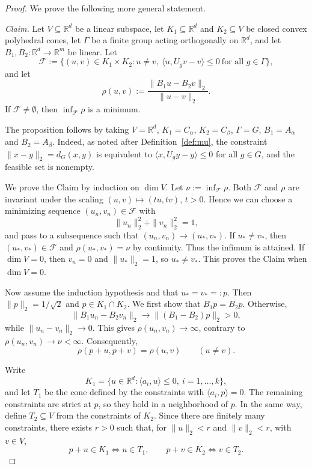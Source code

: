 \documentclass[11pt]{article}
\newcommand{\R}{\mathbb{R}}
\newcommand{\inner}[2]{\langle #1, #2 \rangle}
\theoremstyle{definition}
\begin{document}
\begin{proof}
	We prove the following more general statement.
	
	\noindent\emph{Claim.}
	Let $V\subseteq\R^d$ be a linear subspace, let
	$K_1\subseteq\R^d$ and $K_2\subseteq V$ be closed convex
	polyhedral cones, let $\Gamma$ be a finite group acting
	orthogonally on $\R^d$, and let
	$B_1,B_2:\R^d\to\R^m$ be linear. Let
	\[
	\mathcal F:=\bigl\{(u,v)\in K_1\times K_2:
	u\neq v,\ 
	\inner{u}{U_gv-v}\le0\ \text{for all }g\in\Gamma\bigr\},
	\]
	and let
	\[
	\rho(u,v):=\frac{\|B_1u-B_2v\|_2}{\|u-v\|_2}.
	\]
	If $\mathcal F\neq\emptyset$, then
	$\inf_{\mathcal F}\rho$ is a minimum.
	
	The proposition follows by taking $V=\R^d$,
	$K_1=C_\alpha$, $K_2=C_\beta$,
	$\Gamma=G$, $B_1=A_\alpha$ and $B_2=A_\beta$.
	Indeed, as noted after Definition~\ref{def:mu},
	the constraint $\|x-y\|_2=d_G(x,y)$ is equivalent to
	$\inner{x}{U_gy-y}\le0$ for all $g\in G$,
	and the feasible set is nonempty.
	
	We prove the Claim by induction on $\dim V$.
	Let $\nu:=\inf_{\mathcal F}\rho$.
	Both $\mathcal F$ and $\rho$ are invariant under
	the scaling $(u,v)\mapsto(tu,tv)$, $t>0$.
	Hence we can choose a minimizing sequence
	$(u_n,v_n)\in\mathcal F$ with
	\[
	\|u_n\|_2^2+\|v_n\|_2^2=1,
	\]
	and pass to a subsequence such that
	$(u_n,v_n)\to(u_*,v_*)$.
	If $u_*\neq v_*$, then $(u_*,v_*)\in\mathcal F$
	and $\rho(u_*,v_*)=\nu$ by continuity.
	Thus the infimum is attained.
	If $\dim V=0$, then $v_n=0$ and
	$\|u_*\|_2=1$, so $u_*\neq v_*$.
	This proves the Claim when $\dim V=0$.
	
	Now assume the induction hypothesis and that $u_*=v_*=:p$.
	Then $\|p\|_2=1/\sqrt2$ and $p\in K_1\cap K_2$.
	We first show that $B_1p=B_2p$.
	Otherwise,
	\[
	\|B_1u_n-B_2v_n\|_2
	\longrightarrow\|(B_1-B_2)p\|_2>0,
	\]
	while $\|u_n-v_n\|_2\to0$.
	This gives $\rho(u_n,v_n)\to\infty$,
	contrary to $\rho(u_n,v_n)\to\nu<\infty$.
	Consequently,
	\[
	\rho(p+u,p+v)=\rho(u,v)
	\qquad (u\neq v).
	\]
	
	Write
	\[
	K_1=\{u\in\R^d:
	\inner{a_i}{u}\le0,\ i=1,\dots,k\},
	\]
	and let $T_1$ be the cone defined by the
	constraints with $\inner{a_i}{p}=0$.
	The remaining constraints are strict at $p$,
	so they hold in a neighborhood of $p$.
	In the same way, define $T_2\subseteq V$
	from the constraints of $K_2$.
	Since there are finitely many constraints,
	there exists $r>0$ such that, for
	$\|u\|_2<r$ and $\|v\|_2<r$, with $v\in V$,
	\begin{equation}\label{eq:tangent-exact}
		p+u\in K_1\iff u\in T_1,\qquad
		p+v\in K_2\iff v\in T_2.
	\end{equation}
	

\end{proof}
\end{document}

